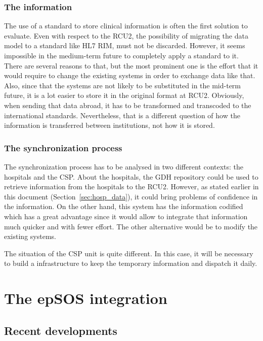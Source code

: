 \subsubsection{The information}

The use of a standard to store clinical information is often the first solution to evaluate. Even with respect to the RCU2, the possibility of migrating the data model to a standard like HL7 RIM, must not be discarded. However, it seems impossible in the medium-term future to completely apply a standard to it. There are several reasons to that, but the most prominent one is the effort that it would require to change the existing systems in order to exchange data like that.
Also, since that the systems are not likely to be substituted in the mid-term future, it is a lot easier to store it in the original format at RCU2. Obviously, when sending that data abroad, it has to be transformed and transcoded to the international standards. Nevertheless, that is a different question of how the information is transferred between institutions, not how it is stored. 


\subsubsection{The synchronization process}

The synchronization process has to be analysed in two different contexts: the hospitals and the CSP. About the hospitals, the GDH repository could be used to retrieve information from the hospitals to the RCU2. However, as stated earlier in this document (Section~\ref{sec:hosp_data}), it could bring problems of confidence in the information. On the other hand, this system has the information codified which has a great advantage since it would allow to integrate that information much quicker and with fewer effort. The other alternative would be to modify the existing systems.

The situation of the CSP unit is quite different. In this case, it will be necessary to build a infrastructure to keep the temporary information and dispatch it daily.



\section{The epSOS integration}

\subsection{Recent developments}

